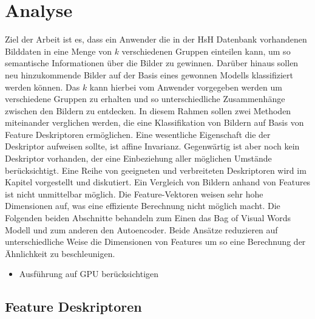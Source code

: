 \chapter{Analyse}

Ziel der Arbeit ist es, dass ein Anwender die in der HsH Datenbank vorhandenen Bilddaten in eine Menge von $k$ verschiedenen Gruppen einteilen kann, um so semantische Informationen über die Bilder zu gewinnen. Darüber hinaus sollen neu hinzukommende Bilder auf der Basis eines gewonnen Modells klassifiziert werden können. Das $k$ kann hierbei vom Anwender vorgegeben werden um verschiedene Gruppen zu erhalten und so unterschiedliche Zusammenhänge zwischen den Bildern zu entdecken. 
In diesem Rahmen sollen zwei Methoden miteinander verglichen werden, die eine Klassifikation von Bildern auf Basis von Feature Deskriptoren ermöglichen. Eine wesentliche Eigenschaft die der Deskriptor aufweisen sollte, ist affine Invarianz. Gegenwärtig ist aber noch kein Deskriptor vorhanden, der eine Einbeziehung aller möglichen Umstände berücksichtigt. Eine Reihe von geeigneten und verbreiteten Deskriptoren wird im Kapitel  vorgestellt und diskutiert.
Ein Vergleich von Bildern anhand von Features ist nicht unmittelbar möglich. Die Feature-Vektoren weisen sehr hohe Dimensionen auf, was eine effiziente Berechnung nicht möglich macht. Die Folgenden beiden Abschnitte behandeln zum Einen das Bag of Visual Words Modell und zum anderen den Autoencoder. Beide Ansätze reduzieren auf unterschiedliche Weise die Dimensionen von Features um so eine Berechnung der Ähnlichkeit zu beschleunigen. 

\begin{itemize}
	\item Ausführung auf GPU berücksichtigen
\end{itemize}

\section{Feature Deskriptoren}
\label{extraction}

